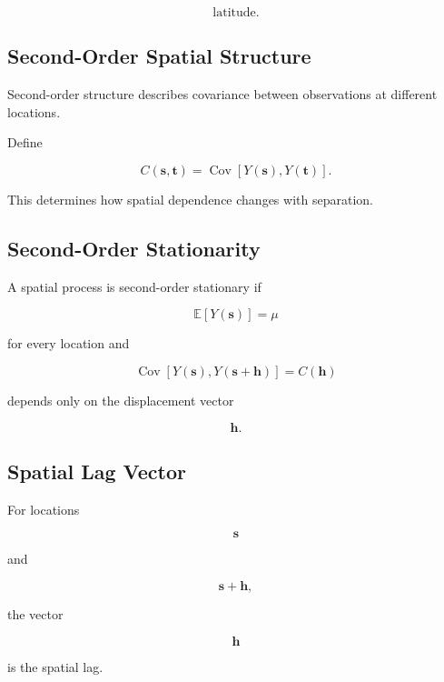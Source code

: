 \[
\boxed{
\text{latitude}.
}
\]

\subsection{Second-Order Spatial Structure}
\label{subsec:second-order-spatial-structure}

Second-order structure describes covariance between observations at
different locations.

Define

\[
\boxed{
C(\mathbf{s},\mathbf{t})
=
\operatorname{Cov}
\left[
Y(\mathbf{s}),
Y(\mathbf{t})
\right].
}
\]

This determines how spatial dependence changes with separation.

\subsection{Second-Order Stationarity}
\label{subsec:spatial-second-order-stationarity}

A spatial process is second-order stationary if

\[
\boxed{
\mathbb{E}
[
Y(\mathbf{s})
]
=
\mu
}
\]

for every location and

\[
\boxed{
\operatorname{Cov}
[
Y(\mathbf{s}),
Y(\mathbf{s}+\mathbf{h})
]
=
C(\mathbf{h})
}
\]

depends only on the displacement vector

\[
\mathbf{h}.
\]

\subsection{Spatial Lag Vector}
\label{subsec:spatial-lag-vector}

For locations

\[
\mathbf{s}
\]

and

\[
\mathbf{s}+\mathbf{h},
\]

the vector

\[
\boxed{
\mathbf{h}
}
\]

is the spatial lag.


